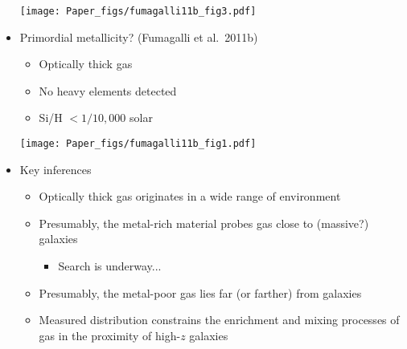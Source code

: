 \documentclass[12pt,letterpaper]{article}
\begin{document}
\begin{Aenumerate}
\begin{itemize}
\texttt{[image: Paper\_figs/fumagalli11b\_fig3.pdf]}

	\item Primordial metallicity?  (Fumagalli et al.\ 2011b)
		\begin{itemize}
		\item Optically thick gas
		\item No heavy elements detected
		\item Si/H $< 1/10,000$ solar
		\end{itemize}

\texttt{[image: Paper\_figs/fumagalli11b\_fig1.pdf]}

	\item Key inferences
		\begin{itemize}
		\item Optically thick gas originates in a wide range of environment
		\item Presumably, the metal-rich material probes gas close to 
		(massive?) galaxies
			\begin{itemize}
			\item Search is underway...
			\end{itemize}
		\item Presumably, the metal-poor gas lies far (or farther)
		from galaxies
		\item Measured distribution constrains the enrichment and mixing
		processes of gas in the proximity of high-$z$ galaxies
		\end{itemize}

	\end{itemize}

\end{Aenumerate}
\end{document}
